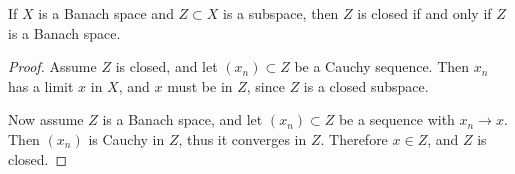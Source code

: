 %
%
%
%
%

\begin{lemma}\label{lem:closed-banach}
If $X$ is a Banach space and $Z \subset X$ is a subspace, then $Z$ is closed
if and only if $Z$ is a Banach space.
\end{lemma}

\begin{proof}
Assume $Z$ is closed, and let $(x_n) \subset Z$ be a Cauchy sequence. Then
$x_n$ has a limit $x$ in $X$, and $x$ must be in $Z$, since $Z$ is a closed
subspace.

Now assume $Z$ is a Banach space, and let $(x_n) \subset Z$ be a sequence
with $x_n \to x$. Then $(x_n)$ is Cauchy in $Z$, thus it converges in $Z$.
Therefore $x \in Z$, and $Z$ is closed.
\end{proof}

